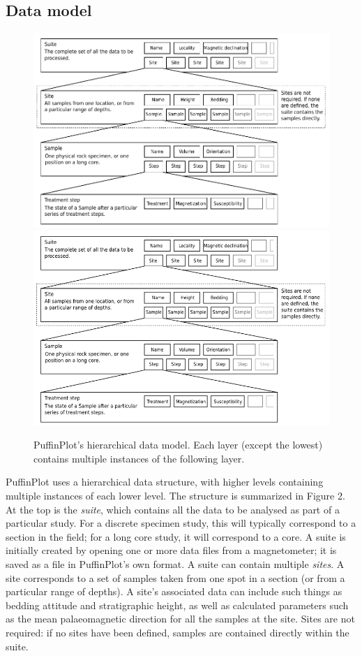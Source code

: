 \documentclass[a4paper,british]{article}
\begin{document}
\subsection{Data model}

\begin{figure}[htbp]
\centering
\ifpdf\includegraphics{figures/data-model.pdf}
\else\includegraphics{figures/data-model.png}
\fi
\caption{PuffinPlot's hierarchical data model. Each layer (except the
lowest) contains multiple instances of the following layer.}
\end{figure}

PuffinPlot uses a hierarchical data structure, with higher levels containing
multiple instances of each lower level. The structure is summarized in Figure
2. At the top is the \emph{suite}, which contains all the data to be analysed
as part of a particular study. For a discrete specimen study, this will
typically correspond to a section in the field; for a long core study, it
will correspond to a core. A suite is initially created by opening one or
more data files from a magnetometer; it is saved as a file in PuffinPlot's
own format. A suite can contain multiple \emph{sites}. A site corresponds to
a set of samples taken from one spot in a section (or from a particular range
of depths). A site's associated data can include such things as bedding
attitude and stratigraphic height, as well as calculated parameters such as
the mean palaeomagnetic direction for all the samples at the site. Sites are
not required: if no sites have been defined, samples are contained directly
within the suite.
\end{document}
